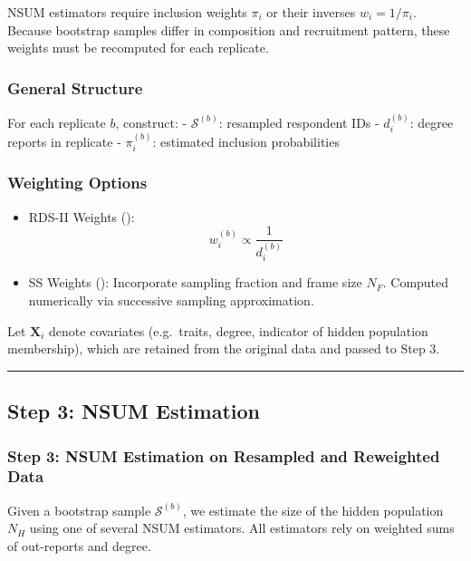 \documentclass[
  12pt,
  letterpaper,
  DIV=11,
  numbers=noendperiod]{scrartcl}
\theoremstyle{plain}
\theoremstyle{definition}
\begin{document}
NSUM estimators require inclusion weights \(\pi_i\) or their inverses
\(w_i = 1 / \pi_i\). Because bootstrap samples differ in composition and
recruitment pattern, these weights must be recomputed for each
replicate.

\subsubsection{General Structure}\label{general-structure}

For each replicate \(b\), construct: - \(\mathcal{S}^{(b)}\): resampled
respondent IDs - \(d_i^{(b)}\): degree reports in replicate -
\(\pi_i^{(b)}\): estimated inclusion probabilities

\subsubsection{Weighting Options}\label{weighting-options}

\begin{itemize}
\item
  RDS-II Weights (\textcite{volz08-probability}): \[
  w_i^{(b)} \propto \frac{1}{d_i^{(b)}}
  \]
\item
  SS Weights (\textcite{gile11-improved}): Incorporate sampling fraction
  and frame size \(N_F\). Computed numerically via successive sampling
  approximation.
\end{itemize}

Let \(\mathbf{X}_i\) denote covariates (e.g.~traits, degree, indicator
of hidden population membership), which are retained from the original
data and passed to Step 3.

\begin{center}\rule{0.5\linewidth}{0.5pt}\end{center}

\subsection{Step 3: NSUM Estimation}\label{step-3-nsum-estimation}

\subsubsection{Step 3: NSUM Estimation on Resampled and Reweighted
Data}\label{step-3-nsum-estimation-on-resampled-and-reweighted-data}

Given a bootstrap sample \(\mathcal{S}^{(b)}\), we estimate the size of
the hidden population \(N_H\) using one of several NSUM estimators. All
estimators rely on weighted sums of out-reports and degree.
\end{document}
